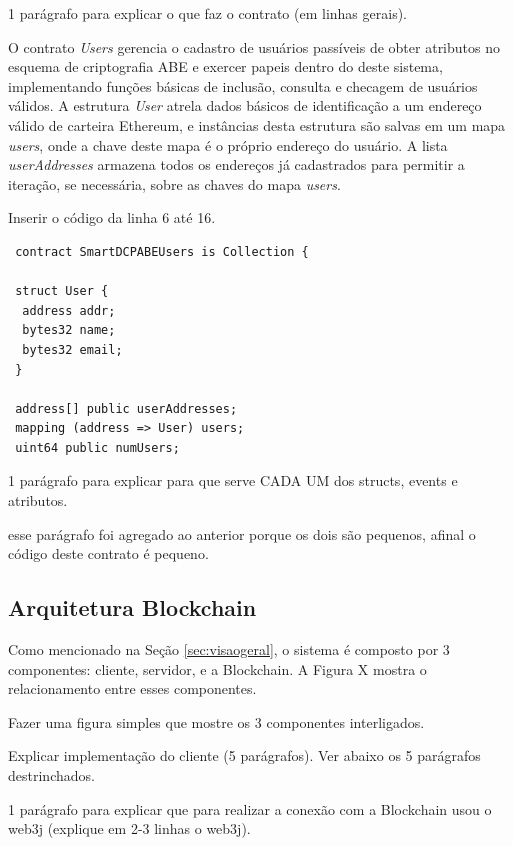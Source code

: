 \documentclass[a4paper,11pt]{article}
\begin{document}
{\color{Magenta} 1 parágrafo para explicar o que faz o contrato (em linhas gerais).}

O contrato \emph{Users} gerencia o cadastro de usuários passíveis de obter atributos no esquema de criptografia ABE e exercer papeis dentro do deste sistema, implementando funções básicas de inclusão, consulta e checagem de usuários válidos.
A estrutura \emph{User} atrela dados básicos de identificação a um endereço válido de carteira Ethereum, e instâncias desta estrutura são salvas em um mapa \emph{users}, onde a chave deste mapa é o próprio endereço do usuário.
A lista \emph{userAddresses} armazena todos os endereços já cadastrados para permitir a iteração, se necessária, sobre as chaves do mapa \emph{users}.

{\color{Magenta} Inserir o código da linha 6 até 16.}

\begin{lstlisting}
 contract SmartDCPABEUsers is Collection {

 struct User {
  address addr;
  bytes32 name;
  bytes32 email;
 }

 address[] public userAddresses;
 mapping (address => User) users;
 uint64 public numUsers;
\end{lstlisting}

{\color{Magenta} 1 parágrafo para explicar para que serve CADA UM dos structs, events e atributos.}

{\color{RoyalBlue} esse parágrafo foi agregado ao anterior porque os dois são pequenos, afinal o código deste contrato é pequeno.}

\subsection{Arquitetura Blockchain}

Como mencionado na Seção \ref{sec:visaogeral}, o sistema é composto por 3 componentes: cliente, servidor, e a Blockchain. A Figura X mostra o relacionamento entre esses componentes.

{\color{ForestGreen} Fazer uma figura simples que mostre os 3 componentes interligados. }


{\color{ForestGreen} Explicar implementação do cliente (5 parágrafos). Ver abaixo os 5 parágrafos destrinchados. }

{\color{Magenta} 1 parágrafo para explicar que para realizar a conexão com a Blockchain usou o web3j (explique em 2-3 linhas o web3j).}
\end{document}
